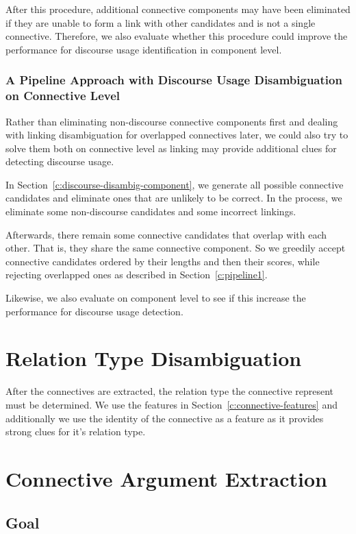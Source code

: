 After this procedure, additional connective components may have been eliminated if
they are unable to form a link with other candidates and is not a single connective.
Therefore, we also evaluate whether this procedure could improve the performance
for discourse usage identification in component level.


\subsubsection{A Pipeline Approach with Discourse Usage Disambiguation on Connective Level}
\label{c:pipeline2}

Rather than eliminating non-discourse connective components first and
dealing with linking disambiguation for overlapped connectives later,
we could also try to solve them both on connective level as linking may
provide additional clues for detecting discourse usage. 

In Section~\ref{c:discourse-disambig-component}, we generate all possible
connective candidates and eliminate ones that are unlikely to be correct.
In the process, we eliminate some non-discourse candidates and some incorrect
linkings.

Afterwards, there remain some connective candidates that overlap with each other.
That is, they share the same connective component. So we greedily accept connective
candidates ordered by their lengths and then their scores, while rejecting
overlapped ones as described in Section~\ref{c:pipeline1}.

Likewise, we also evaluate on component level to see if this increase
the performance for discourse usage detection.

\section{Relation Type Disambiguation}

After the connectives are extracted, the relation type the connective represent
must be determined. We use the features in Section~\ref{c:connective-features}
and additionally we use the identity of the connective as a feature as
it provides strong clues for it's relation type.


\section{Connective Argument Extraction}

\subsection{Goal}

